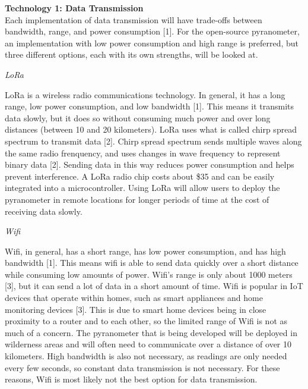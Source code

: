 \documentclass[10pt,draftclsnofoot,onecolumn,letterpaper]{article}
\begin{document}
    {\fontsize{10pt}{12.0pt} \textbf{Technology 1: Data Transmission}\\Each implementation of data transmission will have trade-offs between bandwidth, range, and power consumption [1]. For the open-source pyranometer, an implementation with low power consumption and high range is preferred, but three different options, each with its own strengths, will be looked at.\\\selectfont 
    \par}\par
    {\fontsize{10pt}{12.0pt}\textit{LoRa}\\\selectfont 
    \par}\par
    {\fontsize{10pt}{12.0pt}LoRa is a wireless radio communications technology. In general, it has a long range, low power consumption, and low bandwidth [1]. This means it transmits data slowly, but it does so without consuming much power and over long distances (between 10 and 20 kilometers). LoRa uses what is called chirp spread spectrum to transmit data [2]. Chirp spread spectrum sends multiple waves along the same radio frenquency, and uses changes in wave frequency to represent binary data [2]. Sending data in this way reduces power consumption and helps prevent interference. A LoRa radio chip costs about \$35 and can be easily integrated into a microcontroller. Using LoRa will allow users to deploy the pyranometer in remote locations for longer periods of time at the cost of receiving data slowly.\\\selectfont 
    \par}\par
    {\fontsize{10pt}{12.0pt}\textit{Wifi}\\\selectfont 
    \par}\par
    {\fontsize{10pt}{12.0pt}Wifi, in general, has a short range, has low power consumption, and has high bandwidth [1]. This means wifi is able to send data quickly over a short distance while consuming low amounts of power. Wifi's range is only about 1000 meters [3], but it can send a lot of data in a short amount of time. Wifi is popular in IoT devices that operate within homes, such as smart appliances and home monitoring devices [3]. This is due to smart home devices being in close proximity to a router and to each other, so the limited range of Wifi is not as much of a concern. The pyranometer that is being developed will be deployed in wilderness areas and will often need to communicate over a distance of over 10 kilometers. High bandwidth is also not necessary, as readings are only needed every few seconds, so constant data transmission is not necessary. For these reasons, Wifi is most likely not the best option for data transmission.\\\selectfont 
    \par}\par
\end{document}
